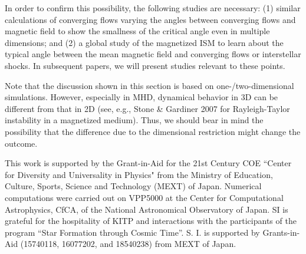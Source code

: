 \documentclass[12pt,preprint]{aastex}
\begin{document}
In order to confirm this possibility, the following studies are necessary:
(1) similar calculations of converging flows varying the angles between converging flows and magnetic field to show the smallness of the critical angle even in multiple dimensions;
and (2) a global study of the magnetized ISM to learn about the typical angle between the mean magnetic field and converging flows or interstellar shocks.
In subsequent papers, we will present studies relevant to these points.

Note that the discussion shown in this section is based on one-/two-dimensional simulations.
However, especially in MHD, dynamical behavior in 3D can be different from that in 2D (see, e.g., Stone \& Gardiner 2007 for Rayleigh-Taylor instability in a magnetized medium).
Thus, we should bear in mind the possibility that the difference due to the dimensional restriction might change the outcome.


\acknowledgments
This work is supported by the Grant-in-Aid for the 21st Century COE ``Center for Diversity and Universality in Physics" from the Ministry of Education, Culture, Sports, Science and Technology (MEXT) of Japan.
Numerical computations were carried out on VPP5000 at the Center for Computational Astrophysics, CfCA, of the National Astronomical Observatory of Japan.
SI is grateful for the hospitality of KITP and interactions with the participants of the program ``Star Formation through Cosmic Time''.
S. I. is supported by Grants-in-Aid (15740118, 16077202, and 18540238) from MEXT of Japan.
\end{document}

